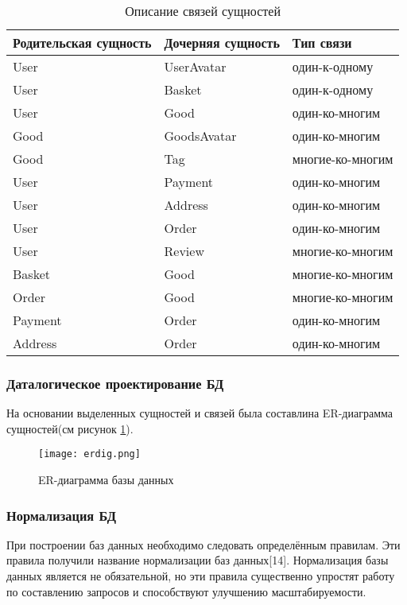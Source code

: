 \begin{longtable}{ | l | l | l | }
    \caption{Описание связей сущностей}
    \label{opisanie:suw}
    \endfirsthead
    \endhead
    \hline
    Родительская сущность & Дочерняя сущность & Тип связи  \\ \hline
    User & UserAvatar & один-к-одному \\ \hline
    User & Basket & один-к-одному \\ \hline
    User & Good & один-ко-многим \\ \hline
    Good & GoodsAvatar & один-ко-многим \\ \hline
    Good & Tag & многие-ко-многим \\ \hline
    User & Payment & один-ко-многим \\ \hline
    User & Address & один-ко-многим \\ \hline
    User & Order & один-ко-многим \\ \hline
    User & Review & многие-ко-многим \\ \hline
    Basket & Good & многие-ко-многим \\ \hline
    Order & Good & многие-ко-многим  \\ \hline
    Payment & Order & один-ко-многим \\ \hline
    Address & Order & один-ко-многим \\
    \hline
\end{longtable}

\subsubsection{Даталогическое проектирование БД}\hfill

На основании выделенных сущностей и связей была составлина ER-диаграмма сущностей(см рисунок \ref{db:erdiag}).

\begin{figure}[!h]
    \centering
    \texttt{[image: erdig.png]}
    \caption{ER-диаграмма базы данных}
    \label{db:erdiag}
\end{figure}

\subsubsection{Нормализация БД}\hfill

При построении баз данных необходимо следовать определённым правилам.
Эти правила получили название нормализации баз данных[14].
Нормализация базы данных является не обязательной, но эти правила существенно упростят работу по составлению запросов и способствуют улучшению масштабируемости.

